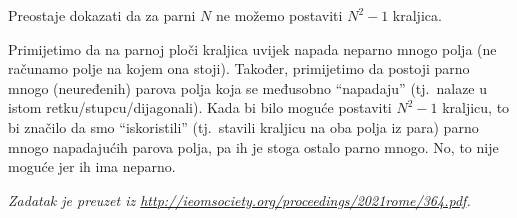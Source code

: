 Preostaje dokazati da za parni $N$ ne možemo postaviti $N^2 - 1$ kraljica.

Primijetimo da na parnoj ploči kraljica uvijek napada neparno mnogo polja (ne računamo polje na kojem ona stoji). Također, primijetimo da postoji parno mnogo (neuređenih) parova polja
koja se međusobno ``napadaju'' (tj.\ nalaze u istom retku/stupcu/dijagonali).
Kada bi bilo moguće postaviti $N^2 - 1$ kraljicu, to bi značilo da smo ``iskoristili''
(tj.\ stavili kraljicu na oba polja iz para) parno mnogo napadajućih parova polja, pa ih je
stoga ostalo parno mnogo. No, to nije moguće jer ih ima neparno.

\bigskip

\textit{Zadatak je preuzet iz \url{http://ieomsociety.org/proceedings/2021rome/364.pdf}.}

